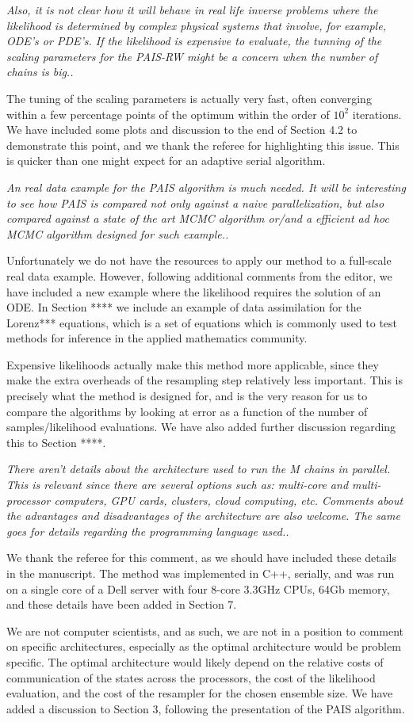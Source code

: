 \documentclass{article}
\newcommand{\comment}[2]{\vspace{0.6cm}{\bf Comment:} {\it #1.}

\vspace{0.3cm}{\bf Answer:} #2}
\begin{document}
\comment{Also, it is not clear how it will behave in real life inverse 
problems where the likelihood is determined by complex physical systems that 
involve, for example, ODE's or PDE's. If the likelihood is expensive to 
evaluate, the tunning of the scaling parameters for the PAIS-RW might be a 
concern when the number of chains is big.}{The tuning of the scaling parameters is actually very fast, often converging within a few percentage points of the optimum within the order of $10^2$ iterations. We have included some plots and discussion to the end of Section 4.2 to demonstrate this point, and we thank the referee for highlighting this issue. This is quicker than one might expect for an adaptive serial algorithm.}%

\comment{An real data example for the PAIS algorithm is much needed. It will be 
interesting to see how PAIS is compared not only against a naive 
parallelization, but also compared against a state of the art MCMC algorithm 
or/and a efficient ad hoc MCMC algorithm designed for such example.}{Unfortunately we do not have the resources to apply our method to a full-scale real data example. However, following additional comments from the editor, we have included a new example where the likelihood requires the solution of an ODE. In Section **** we include an example of data assimilation for the Lorenz*** equations, which is a set of equations which is commonly used to test methods for inference in the applied mathematics community. 

Expensive likelihoods actually make this method more applicable, since they make the extra overheads of the resampling step relatively less important. This is precisely what the method is designed for, and is the very reason for us to compare the algorithms by looking at error as a function of the number of samples/likelihood evaluations. We have also added further discussion regarding this to Section ****.}

\comment{There aren't details about the architecture used to run the M chains in 
parallel. This is relevant since there are several options such as: multi-core 
and multi-processor computers, GPU cards, clusters, cloud computing, etc. 
Comments about the advantages and disadvantages of the architecture 
are also welcome. The same goes for details regarding the programming language 
used.}{We thank the referee for this comment, as we should have included these details in the manuscript. The method was implemented in C++, serially, and was run on a single core of a Dell server with four 8-core 3.3GHz CPUs, 64Gb memory, and these details have been added in Section 7. 

We are not computer scientists, and as such, we are not in a position to comment on specific architectures, especially as the optimal architecture would be problem specific. The optimal architecture would likely depend on the relative costs of communication of the states across the processors, the cost of the likelihood evaluation, and the cost of the resampler for the chosen ensemble size. We have added a discussion to Section 3, following the presentation of the PAIS algorithm.}
\end{document}

